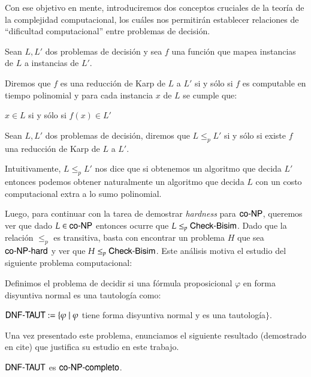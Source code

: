 Con ese objetivo en mente, introduciremos dos conceptos cruciales de la teoría de la complejidad computacional, los cuáles nos permitirán 
establecer relaciones de ``dificultad computacional'' entre problemas de decisión.

\begin{definicion}
    Sean $L, L'$ dos problemas de decisión y sea $f$ una función que mapea instancias de $L$ a instancias de $L'$.

    Diremos que $f$ es una reducción de Karp de $L$ a $L'$ si y sólo si $f$ es computable en tiempo polinomial y para cada instancia $x$ de $L$ 
    se cumple que:

    \begin{center}
        $x \in L$ si y sólo si $f(x) \in L'$
    \end{center}
\end{definicion}

\begin{definicion}[$\leq_p$]
    Sean $L, L'$ dos problemas de decisión, diremos que $L \leq_p L'$ si y sólo si existe $f$ una reducción de Karp de $L$ a 
    $L'$. 
\end{definicion}

Intuitivamente, $L \leq_p L'$ nos dice que si obtenemos un algoritmo que decida $L'$ entonces podemos obtener naturalmente un algoritmo 
que decida $L$ con un costo computacional extra a lo sumo polinomial. 

Luego, para continuar con la tarea de demostrar \textit{hardness} para $\rm\textsf{co-NP}$, queremos ver que dado $L \in \rm\textsf{co-NP}$ entonces ocurre que 
$L \leq_p \rm\textsf{Check-Bisim}$. Dado que la relación $\leq_p$ es transitiva, basta con encontrar un problema $H$ que sea $\rm\textsf{co-NP-hard}$ y ver que 
$H \leq_p \rm\textsf{Check-Bisim}$. Este análisis motiva el estudio del siguiente problema computacional:

\begin{definicion}
    Definimos el problema de decidir si una fórmula proposicional $\varphi$ en forma disyuntiva normal es una tautología como:
    \begin{center}
        $\rm\textsf{DNF-TAUT} := \{ \varphi \mid \varphi$ tiene forma disyuntiva normal y es una tautología$\}$.
    \end{center}
\end{definicion}

Una vez presentado este problema, enunciamos el siguiente resultado (demostrado en cite) que justifica su estudio en este trabajo.

\begin{teorema}\label{thm:dnftaut-conp-complete}
    $\rm\textsf{DNF-TAUT}$ es $\rm\textsf{co-NP-completo}$.
\end{teorema}

